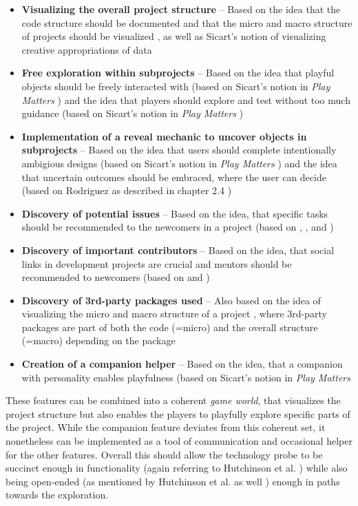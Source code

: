 \begin{itemize}
  \item{\textbf{Visualizing the overall project structure} -- Based on the idea that the code structure should be documented \cite[p. 10]{steinmacher2018let} and that the micro and macro structure of projects should be visualized \cite[p. 284]{dagenais2010moving}, as well as Sicart's notion of visualizing creative appropriations of data \cite[p. 28]{sicart2014play}}
  \item{\textbf{Free exploration within subprojects} -- Based on the idea that playful objects should be freely interacted with (based on Sicart's notion in \textit{Play Matters} \cite[p. 40]{sicart2014play}) and the idea that players should explore and test without too much guidance (based on Sicart's notion in \textit{Play Matters} \cite[p. 57]{sicart2014play})}
  \item{\textbf{Implementation of a reveal mechanic to uncover objects in subprojects} -- Based on the idea that users should complete intentionally ambigious designs (based on Sicart's notion in \textit{Play Matters} \cite[p. 31]{sicart2014play}) and the idea that uncertain outcomes should be embraced, where the user can decide (based on Rodriguez as described in chapter 2.4 \cite{rodriguez2006playful})}
  \item{\textbf{Discovery of potential issues} -- Based on the idea, that specific tasks should be recommended to the newcomers in a project (based on \cite{latoza2006maintaining}, \cite[p. 36]{yates2014onboarding}, and \cite[p. 8]{steinmacher2018let})}
  \item{\textbf{Discovery of important contributors} -- Based on the idea, that social links in development projects are crucial and mentors should be recommended to newcomers (based on \cite[p. 8]{steinmacher2018let} and \cite[p. 284]{dagenais2010moving})}
  \item{\textbf{Discovery of 3rd-party packages used} -- Also based on the idea of visualizing the micro and macro structure of a project \cite[p. 284]{dagenais2010moving}, where 3rd-party packages are part of both the code (=micro) and the overall structure (=macro) depending on the package}
  \item{\textbf{Creation of a companion helper} -- Based on the idea, that a companion with personality enables playfulness (based on Sicart's notion in \textit{Play Matters} \cite[p. 32]{sicart2014play}}
\end{itemize}

These features can be combined into a coherent \textit{game world}, that visualizes the project structure but also enables the players to playfully explore specific parts of the project. While the companion feature deviates from this coherent set, it nonetheless can be implemented as a tool of communication and occasional helper for the other features. Overall this should allow the technology probe to be succinct enough in functionality (again referring to Hutchinson et al. \cite[p. 18]{hutchinson2003technology}) while also being open-ended (as mentioned by Hutchinson et al. as well \cite[p. 19]{hutchinson2003technology}) enough in paths towards the exploration.

